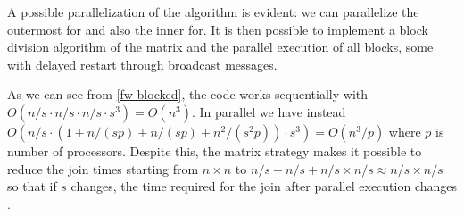 
A possible parallelization of the algorithm is evident: we can parallelize the outermost for and also the inner for.
It is then possible to implement a block division algorithm of the matrix and the parallel execution of all blocks, some with delayed restart through broadcast messages.

As we can see from \cref{fw-blocked}, the code works sequentially with \(O(n/s \cdot n/s \cdot n/s \cdot s^3) =O(n^3) \).
In parallel we have instead \(O(n/s \cdot (1+n/(sp)+n/(sp)+n^2/(s^2p))\cdot s^3)=O(n^3/p)\) where \(p\) is number of processors.
Despite this, the matrix strategy makes it possible to reduce the join times starting from \(n\times n\) to \(n/s + n/s + n/s \times n/s \approx n/s \times n/s\) so that if \(s\) changes, the time required for the join after parallel execution changes \cite{rucci}.

\FloatBarrier
